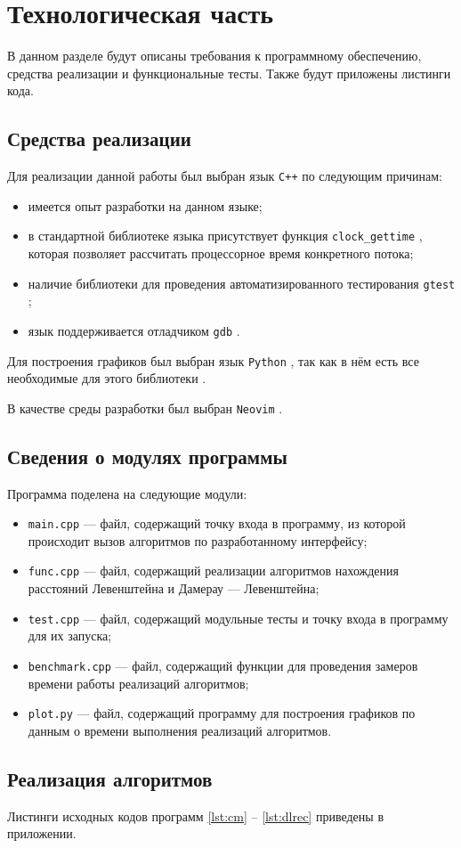 \section{Технологическая часть}

В данном разделе будут описаны требования к программному обеспечению, средства реализации и функциональные тесты.
Также будут приложены листинги кода.

\subsection{Средства реализации}

Для реализации данной работы был выбран язык \texttt{C++} \cite{isocpp} по следующим причинам:
\begin{itemize}
    \item имеется опыт разработки на данном языке;
    \item в стандартной библиотеке языка присутствует функция \texttt{clock\_gettime} \cite{cpptime}, которая позволяет рассчитать процессорное время конкретного потока;
    \item наличие библиотеки для проведения автоматизированного тестирования \texttt{gtest} \cite{gtest};
    \item язык поддерживается отладчиком \texttt{gdb} \cite{gdb}.
\end{itemize}

Для построения графиков был выбран язык \texttt{Python} \cite{python}, так как в нём есть все необходимые для этого библиотеки \cite{pd} \cite{np} \cite{mpl}.

В качестве среды разработки был выбран \texttt{Neovim} \cite{nvim}. %

\subsection{Сведения о модулях программы}

Программа поделена на следующие модули:
\begin{itemize}
    \item \texttt{main.cpp} --- файл, содержащий точку входа в программу, из которой происходит вызов алгоритмов по разработанному интерфейсу;
    \item \texttt{func.cpp} --- файл, содержащий реализации алгоритмов нахождения расстояний Левенштейна и Дамерау --- Левенштейна;
    \item \texttt{test.cpp} --- файл, содержащий модульные тесты и точку входа в программу для их запуска;
    \item \texttt{benchmark.cpp} --- файл, содержащий функции для проведения замеров времени работы реализаций алгоритмов;
    \item \texttt{plot.py} --- файл, содержащий программу для построения графиков по данным о времени выполнения реализаций алгоритмов.
\end{itemize}

\subsection{Реализация алгоритмов}

Листинги исходных кодов программ \ref{lst:cm} -- \ref{lst:dlrec} приведены в приложении.
